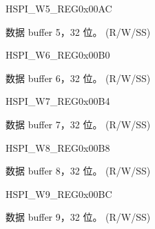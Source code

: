 \begin{register}{H}{SPI\_W5\_REG}{0x00AC}\label{regdesc:SPIW5REG}
%
\regnewline%
\begin{regdesc}\begin{reglist}
\label{fielddesc:SPIBUF5}\item [SPI\_BUF5] 数据 buffer 5，32 位。 (R/W/SS)
\end{reglist}\end{regdesc}
\end{register}


\begin{register}{H}{SPI\_W6\_REG}{0x00B0}\label{regdesc:SPIW6REG}
%
\regnewline%
\begin{regdesc}\begin{reglist}
\label{fielddesc:SPIBUF6}\item [SPI\_BUF6] 数据 buffer 6，32 位。 (R/W/SS)
\end{reglist}\end{regdesc}
\end{register}


\begin{register}{H}{SPI\_W7\_REG}{0x00B4}\label{regdesc:SPIW7REG}
%
\regnewline%
\begin{regdesc}\begin{reglist}
\label{fielddesc:SPIBUF7}\item [SPI\_BUF7] 数据 buffer 7，32 位。 (R/W/SS)
\end{reglist}\end{regdesc}
\end{register}


\begin{register}{H}{SPI\_W8\_REG}{0x00B8}\label{regdesc:SPIW8REG}
%
\regnewline%
\begin{regdesc}\begin{reglist}
\label{fielddesc:SPIBUF8}\item [SPI\_BUF8] 数据 buffer 8，32 位。 (R/W/SS)
\end{reglist}\end{regdesc}
\end{register}


\begin{register}{H}{SPI\_W9\_REG}{0x00BC}\label{regdesc:SPIW9REG}
%
\regnewline%
\begin{regdesc}\begin{reglist}
\label{fielddesc:SPIBUF9}\item [SPI\_BUF9] 数据 buffer 9，32 位。 (R/W/SS)
\end{reglist}\end{regdesc}
\end{register}


